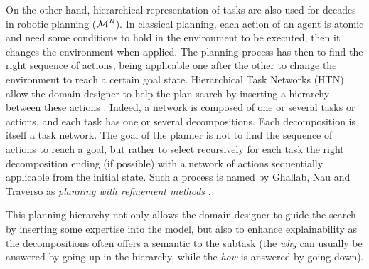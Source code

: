 \documentclass[a4paper,11pt,twoside]{StyleThese}
\begin{document}
On the other hand, hierarchical representation of tasks are also used for decades in robotic planning ($\mathcal{M}^R$). In classical planning, each action of an agent is atomic and need some conditions to hold in the environment to be executed, then it changes the environment when applied. The planning process has then to find the right sequence of actions, being applicable one after the other to change the environment to reach a certain goal state. Hierarchical Task Networks (HTN) allow the domain designer to help the plan search by inserting a hierarchy between these actions \cite{erol1996complexity}. Indeed, a network is composed of one or several tasks or actions, and each task has one or several decompositions. Each decomposition is itself a task network. The goal of the planner is not to find the sequence of actions to reach a goal, but rather to select recursively for each task the right decomposition ending (if possible) with a network of actions sequentially applicable from the initial state. Such a process is named by Ghallab, Nau and Traverso as \textit{planning with refinement methods} \cite{ghallab_nau_traverso_2016}.

This planning hierarchy not only allows the domain designer to guide the search by inserting some expertise into the model, but also to enhance explainability as the decompositions often offers a semantic to the subtask (the \textit{why} can usually be answered by going up in the hierarchy, while the \textit{how} is answered by going down).
\end{document}
